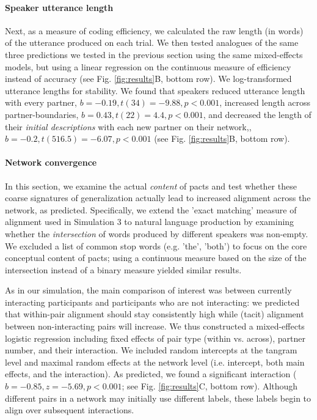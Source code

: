\paragraph{Speaker utterance length}

Next, as a measure of coding efficiency, we calculated the raw length (in words) of the utterance produced on each trial.
We then tested analogues of the same three predictions we tested in the previous section using the same mixed-effects models, but using a linear regression on the continuous measure of efficiency instead of accuracy (see Fig. \ref{fig:results}B, bottom row).
We log-transformed utterance lengths for stability.
We found that speakers reduced utterance length with every partner, $b = -0.19, t(34) = -9.88, p < 0.001$, increased length across partner-boundaries, $b = 0.43, t(22) = 4.4, p < 0.001$, and decreased the length of their \emph{initial descriptions} with each new partner on their network,, $b = -0.2, t(516.5) = -6.07, p < 0.001$ (see Fig. \ref{fig:results}B, bottom row).

\paragraph{Network convergence }

In this section, we examine the actual \emph{content} of pacts and test whether these coarse signatures of generalization actually lead to increased alignment across the network, as predicted. 
Specifically, we extend the 'exact matching' measure of alignment used in Simulation 3 to natural language production by examining whether the \emph{intersection} of words produced by different speakers was non-empty.
We excluded a list of common stop words (e.g. 'the', 'both') to focus on the core conceptual content of pacts; using a continuous measure based on the size of the intersection instead of a binary measure yielded similar results.

As in our simulation, the main comparison of interest was between currently interacting participants and participants who are not interacting: we predicted that within-pair alignment should stay consistently high while (tacit) alignment between non-interacting pairs will increase. 
We thus constructed a mixed-effects logistic regression including fixed effects of pair type (within vs. across), partner number, and their interaction.
We included random intercepts at the tangram level and maximal random effects at the network level (i.e. intercept, both main effects, and the interaction).
As predicted, we found a significant interaction ($b = -0.85, z = -5.69, p < 0.001$; see Fig. \ref{fig:results}C, bottom row).
Although different pairs in a network may initially use different labels, these labels begin to align over subsequent interactions. 


